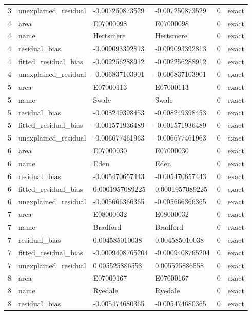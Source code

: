\documentclass[10pt]{article}
\begin{document}
\begin{longtable}{@{}r p{}p{}p{}rl@{}}
3 & unexplained\_\allowbreak{}residual & -0.007250873529 & -0.007250873529 & 0 & exact \\
4 & area & E07000098 & E07000098 & 0 & exact \\
4 & name & Hertsmere & Hertsmere & 0 & exact \\
4 & residual\_\allowbreak{}bias & -0.009093392813 & -0.009093392813 & 0 & exact \\
4 & fitted\_\allowbreak{}residual\_\allowbreak{}bias & -0.002256288912 & -0.002256288912 & 0 & exact \\
4 & unexplained\_\allowbreak{}residual & -0.006837103901 & -0.006837103901 & 0 & exact \\
5 & area & E07000113 & E07000113 & 0 & exact \\
5 & name & Swale & Swale & 0 & exact \\
5 & residual\_\allowbreak{}bias & -0.008249398453 & -0.008249398453 & 0 & exact \\
5 & fitted\_\allowbreak{}residual\_\allowbreak{}bias & -0.001571936489 & -0.001571936489 & 0 & exact \\
5 & unexplained\_\allowbreak{}residual & -0.006677461963 & -0.006677461963 & 0 & exact \\
6 & area & E07000030 & E07000030 & 0 & exact \\
6 & name & Eden & Eden & 0 & exact \\
6 & residual\_\allowbreak{}bias & -0.005470657443 & -0.005470657443 & 0 & exact \\
6 & fitted\_\allowbreak{}residual\_\allowbreak{}bias & 0.0001957089225 & 0.0001957089225 & 0 & exact \\
6 & unexplained\_\allowbreak{}residual & -0.005666366365 & -0.005666366365 & 0 & exact \\
7 & area & E08000032 & E08000032 & 0 & exact \\
7 & name & Bradford & Bradford & 0 & exact \\
7 & residual\_\allowbreak{}bias & 0.004585010038 & 0.004585010038 & 0 & exact \\
7 & fitted\_\allowbreak{}residual\_\allowbreak{}bias & -0.0009408765204 & -0.0009408765204 & 0 & exact \\
7 & unexplained\_\allowbreak{}residual & 0.005525886558 & 0.005525886558 & 0 & exact \\
8 & area & E07000167 & E07000167 & 0 & exact \\
8 & name & Ryedale & Ryedale & 0 & exact \\
8 & residual\_\allowbreak{}bias & -0.005474680365 & -0.005474680365 & 0 & exact \\

\end{longtable}
\end{document}

